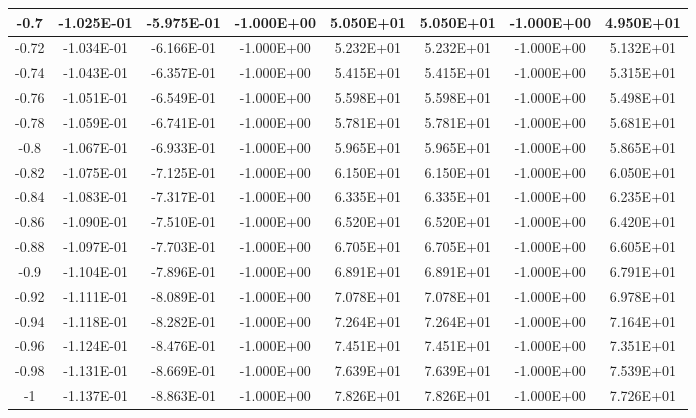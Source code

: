 \documentclass{article}
\begin{document}
\begin{center}
\begin{longtable}{|c|c|c|c|c|c|c|c|}
        -0.7 & -1.025E-01 & -5.975E-01 & -1.000E+00 & 5.050E+01 & 5.050E+01 & -1.000E+00 & 4.950E+01 \\ \hline
        -0.72 & -1.034E-01 & -6.166E-01 & -1.000E+00 & 5.232E+01 & 5.232E+01 & -1.000E+00 & 5.132E+01 \\ \hline
        -0.74 & -1.043E-01 & -6.357E-01 & -1.000E+00 & 5.415E+01 & 5.415E+01 & -1.000E+00 & 5.315E+01 \\ \hline
        -0.76 & -1.051E-01 & -6.549E-01 & -1.000E+00 & 5.598E+01 & 5.598E+01 & -1.000E+00 & 5.498E+01 \\ \hline
        -0.78 & -1.059E-01 & -6.741E-01 & -1.000E+00 & 5.781E+01 & 5.781E+01 & -1.000E+00 & 5.681E+01 \\ \hline
        -0.8 & -1.067E-01 & -6.933E-01 & -1.000E+00 & 5.965E+01 & 5.965E+01 & -1.000E+00 & 5.865E+01 \\ \hline
        -0.82 & -1.075E-01 & -7.125E-01 & -1.000E+00 & 6.150E+01 & 6.150E+01 & -1.000E+00 & 6.050E+01 \\ \hline
        -0.84 & -1.083E-01 & -7.317E-01 & -1.000E+00 & 6.335E+01 & 6.335E+01 & -1.000E+00 & 6.235E+01 \\ \hline
        -0.86 & -1.090E-01 & -7.510E-01 & -1.000E+00 & 6.520E+01 & 6.520E+01 & -1.000E+00 & 6.420E+01 \\ \hline
        -0.88 & -1.097E-01 & -7.703E-01 & -1.000E+00 & 6.705E+01 & 6.705E+01 & -1.000E+00 & 6.605E+01 \\ \hline
        -0.9 & -1.104E-01 & -7.896E-01 & -1.000E+00 & 6.891E+01 & 6.891E+01 & -1.000E+00 & 6.791E+01 \\ \hline
        -0.92 & -1.111E-01 & -8.089E-01 & -1.000E+00 & 7.078E+01 & 7.078E+01 & -1.000E+00 & 6.978E+01 \\ \hline
        -0.94 & -1.118E-01 & -8.282E-01 & -1.000E+00 & 7.264E+01 & 7.264E+01 & -1.000E+00 & 7.164E+01 \\ \hline
        -0.96 & -1.124E-01 & -8.476E-01 & -1.000E+00 & 7.451E+01 & 7.451E+01 & -1.000E+00 & 7.351E+01 \\ \hline
        -0.98 & -1.131E-01 & -8.669E-01 & -1.000E+00 & 7.639E+01 & 7.639E+01 & -1.000E+00 & 7.539E+01 \\ \hline
        -1 & -1.137E-01 & -8.863E-01 & -1.000E+00 & 7.826E+01 & 7.826E+01 & -1.000E+00 & 7.726E+01 \\ \hline
    \end{longtable}
\end{center}
\end{document}
